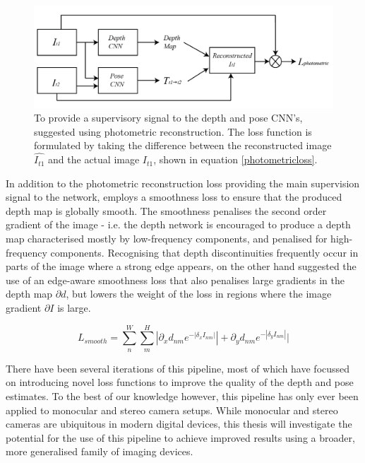 \documentclass[openany]{book}
\begin{document}
\begin{figure}
    \centering 
    \includegraphics[width=5in]{images/mlpipeline.png}
    \caption{To provide a supervisory signal to the depth and pose CNN's, \cite{garg2016unsupervised} suggested using photometric reconstruction. The loss function is formulated by taking the difference between the reconstructed image $\hat{I_{t1}}$ and the actual image $I_{t1}$, shown in equation \ref{photometricloss}.}
    \label{supervisedMLCNNS}
\end{figure}


In addition to the photometric reconstruction loss providing the main supervision signal to the network, \cite{zhou2017unsupervised} employs a smoothness loss to ensure that the produced depth map is globally smooth. The smoothness penalises the second order gradient of the image - i.e. the depth network is encouraged to produce a depth map characterised mostly by low-frequency components, and penalised for high-frequency components. Recognising that depth discontinuities frequently occur in parts of the image where a strong edge appears, \cite{godard2016consistency} on the other hand suggested the use of an edge-aware smoothness loss that also penalises large gradients in the depth map $\partial{d}$, but lowers the weight of the loss in regions where the image gradient $\partial{I}$ is large. 

\begin{equation}
    L_{smooth} =  \sum_n^W \sum_m^H |\partial_x d_{nm} e^{-|\delta_x I_{nm}|}| + \partial_y d_{nm} e^{-|\delta_y I_{nm}|}|
\end{equation}


There have been several iterations \cite{godard2016consistency, godard2018selfsupervised, zhan2018deepfeature} of this pipeline, most of which have focussed on introducing novel loss functions to improve the quality of the depth and pose estimates. To the best of our knowledge however, this pipeline has only ever been applied to monocular and stereo camera setups. While monocular and stereo cameras are ubiquitous in modern digital devices, this thesis will investigate the potential for the use of this pipeline to achieve improved results using a broader, more generalised family of imaging devices. 
\end{document}
